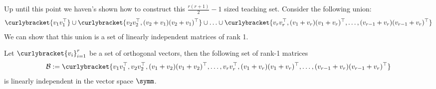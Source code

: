 Up until this point we haven's shown how to construct this $\frac{r(r+1)}{2}-1$ sized teaching set. 
Consider the following union:
\begin{align*}
    \curlybracket{v_1v_1^{\top}} \cup \curlybracket{v_2v_2^{\top}, (v_2 + v_1)(v_2 + v_1)^{\top}} \cup \ldots \cup \curlybracket{v_rv_r^{\top}, (v_1 + v_r)(v_1 + v_r)^{\top},\ldots, (v_{r-1} + v_r)(v_{r-1} + v_r)^{\top}}
\end{align*}
We can show that this union is a set of linearly independent matrices of rank 1.
\begin{lemma}\label{lemma: basis}
    Let $\curlybracket{v_i}_{i=1}^r$ be a set of orthogonal vectors, then the following set of rank-1 matrices
    \begin{align*}
        \mathcal{B} := \curlybracket{v_1v_1^{\top},v_2v_2^{\top}, (v_1 + v_2)(v_1 + v_2)^{\top},\ldots,v_rv_r^{\top}, (v_1 + v_r)(v_1 + v_r)^{\top},\ldots, (v_{r-1} + v_r)(v_{r-1} + v_r)^{\top}}
    \end{align*}
    is linearly independent in the vector space $\symm$.
\end{lemma}

